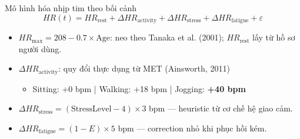 \documentclass[11pt]{beamer}
\begin{document}
\begin{frame}{Mô hình hóa nhịp tim theo bối cảnh}
\small
\begin{equation*}
\boxed{HR(t) = HR_{\text{rest}} + \Delta HR_{\text{activity}} + \Delta HR_{\text{stress}} + \Delta HR_{\text{fatigue}} + \varepsilon}
\end{equation*}

\begin{itemize}
    \item $HR_{\max}=208-0.7\times\text{Age}$: neo theo Tanaka et al. (2001); $HR_{\text{rest}}$ lấy từ hồ sơ người dùng.
    \item $\Delta HR_{\text{activity}}$: quy đổi thực dụng từ MET (Ainsworth, 2011)
    \begin{itemize}
        \scriptsize
        \item Sitting: +0 bpm | Walking: +18 bpm | Jogging: \textbf{+40 bpm}
    \end{itemize}
    \item $\Delta HR_{\text{stress}} = (\text{StressLevel} - 4) \times 3$ bpm --- heuristic từ cơ chế hệ giao cảm.
    \item $\Delta HR_{\text{fatigue}} = (1 - E) \times 5$ bpm --- correction nhỏ khi phục hồi kém.
\end{itemize}

\vspace{0.1cm}
\end{frame}
\end{document}
